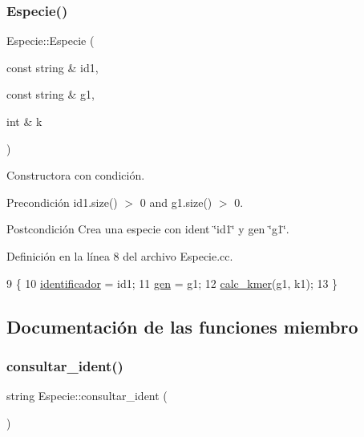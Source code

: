 \subsubsection{\texorpdfstring{Especie()}{Especie()}}
{\footnotesize\ttfamily Especie\+::\+Especie (\begin{DoxyParamCaption}\item[{const string \&}]{id1,  }\item[{const string \&}]{g1,  }\item[{int \&}]{k }\end{DoxyParamCaption})}



Constructora con condición. 

\begin{DoxyPrecond}{Precondición}
id1.\+size() $>$ 0 and g1.\+size() $>$ 0. 
\end{DoxyPrecond}
\begin{DoxyPostcond}{Postcondición}
Crea una especie con ident \char`\"{}id1\char`\"{} y gen \char`\"{}g1\char`\"{}. 
\end{DoxyPostcond}


Definición en la línea 8 del archivo Especie.\+cc.


\begin{DoxyCode}
9 \{
10     \hyperlink{class_especie_a9efba6a1733042dab5c3cb63533e0628}{identificador} = id1;
11     \hyperlink{class_especie_ac35bb565f7346cd6317b3a8c849456d1}{gen} = g1;
12     \hyperlink{class_especie_afbfd4e6e131adf6a2a83e7c495a93a2a}{calc\_kmer}(g1, k1);
13 \}
\end{DoxyCode}


\subsection{Documentación de las funciones miembro}
\mbox{\label{class_especie_a2c3f4a6aa3337ce1fa7e8c7d5be73c50}} 
\subsubsection{\texorpdfstring{consultar\+\_\+ident()}{consultar\_ident()}}
{\footnotesize\ttfamily string Especie\+::consultar\+\_\+ident (\begin{DoxyParamCaption}{ }\end{DoxyParamCaption})}



